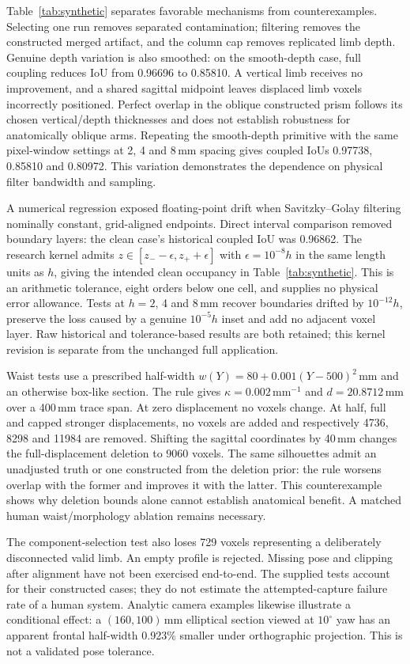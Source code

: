 \documentclass[11pt,a4paper]{article}
\begin{document}
Table~\ref{tab:synthetic} separates favorable mechanisms from counterexamples. Selecting one run removes separated contamination; filtering removes the constructed merged artifact, and the column cap removes replicated limb depth. Genuine depth variation is also smoothed: on the smooth-depth case, full coupling reduces IoU from 0.96696 to 0.85810. A vertical limb receives no improvement, and a shared sagittal midpoint leaves displaced limb voxels incorrectly positioned. Perfect overlap in the oblique constructed prism follows its chosen vertical/depth thicknesses and does not establish robustness for anatomically oblique arms. Repeating the smooth-depth primitive with the same pixel-window settings at 2, 4 and 8\,mm spacing gives coupled IoUs 0.97738, 0.85810 and 0.80972. This variation demonstrates the dependence on physical filter bandwidth and sampling.

A numerical regression exposed floating-point drift when Savitzky--Golay filtering nominally constant, grid-aligned endpoints. Direct interval comparison removed boundary layers: the clean case's historical coupled IoU was 0.96862. The research kernel admits $z\in[z_- -\epsilon,z_++\epsilon]$ with $\epsilon=10^{-8}h$ in the same length units as $h$, giving the intended clean occupancy in Table~\ref{tab:synthetic}. This is an arithmetic tolerance, eight orders below one cell, and supplies no physical error allowance. Tests at $h=2$, 4 and 8\,mm recover boundaries drifted by $10^{-12}h$, preserve the loss caused by a genuine $10^{-5}h$ inset and add no adjacent voxel layer. Raw historical and tolerance-based results are both retained; this kernel revision is separate from the unchanged full application.

Waist tests use a prescribed half-width $w(Y)=80+0.001(Y-500)^2$\,mm and an otherwise box-like section. The rule gives $\kappa=0.002$\,mm$^{-1}$ and $d=20.8712$\,mm over a 400\,mm trace span. At zero displacement no voxels change. At half, full and capped stronger displacements, no voxels are added and respectively 4736, 8298 and 11984 are removed. Shifting the sagittal coordinates by 40\,mm changes the full-displacement deletion to 9060 voxels. The same silhouettes admit an unadjusted truth or one constructed from the deletion prior: the rule worsens overlap with the former and improves it with the latter. This counterexample shows why deletion bounds alone cannot establish anatomical benefit. A matched human waist/morphology ablation remains necessary.

The component-selection test also loses 729 voxels representing a deliberately disconnected valid limb. An empty profile is rejected. Missing pose and clipping after alignment have not been exercised end-to-end. The supplied tests account for their constructed cases; they do not estimate the attempted-capture failure rate of a human system. Analytic camera examples likewise illustrate a conditional effect: a $(160,100)$\,mm elliptical section viewed at $10^\circ$ yaw has an apparent frontal half-width 0.923\% smaller under orthographic projection. This is not a validated pose tolerance.
\end{document}
